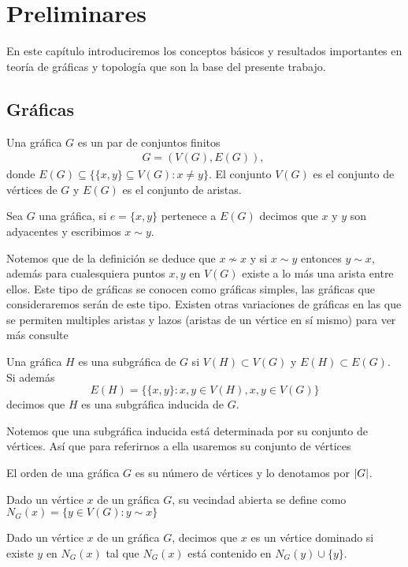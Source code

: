\chapter{Preliminares}                %
En este capítulo introduciremos los conceptos básicos y resultados importantes en teoría de gráficas y topología que son la base del presente trabajo.
\section{Gráficas}
\begin{Defi}[Gráfica]
Una gráfica $G$ es un par de conjuntos finitos 
\begin{eqnarray*}
G=(V(G),E(G)),\
\end{eqnarray*}
donde $E(G)\subseteq \{\{x,y\}\subseteq V(G):x \neq y\}$. El conjunto $V(G)$ es el conjunto de vértices de $G$ y $E(G)$ es el conjunto de aristas.
\end{Defi}
\begin{Defi}
Sea $G$ una gráfica, si $e =\{x,y\}$ pertenece a $E(G)$ decimos que $x$ y $y$ son adyacentes y escribimos $x \sim y$.
\end{Defi}
 Notemos que de la definición se deduce que $x\nsim x$ y si $x\sim y$ entonces $y\sim x$, además para cualesquiera puntos $x,y$ en $V(G)$ existe a lo más una arista entre ellos. Este tipo de gráficas se conocen como gráficas simples, las gráficas que consideraremos serán de este tipo.  
Existen otras variaciones de gráficas en las que se permiten multiples aristas y lazos (aristas de un vértice en sí mismo) para ver más consulte \cite{Harary1969} 

\begin{Defi}[Subgráfica]
Una gráfica $H$ es una subgráfica de $G$ si $V(H)\subset V(G)$ y $E(H)\subset E(G)$. Si además 
\begin{equation*}
E(H) = \{\{x,y\}\colon x,y \in V(H), {x,y}\in V(G)\}
\end{equation*}
decimos que $H$ es una subgráfica inducida de $G$.
\end{Defi}
Notemos que una subgráfica inducida está determinada por su conjunto de vértices. Así que para referirnos a ella usaremos su conjunto de vértices

\begin{Defi}
El orden de una gráfica $G$ es su número de vértices y lo denotamos por $\left| G \right|$.
\end{Defi}
\begin{Defi}
Dado un vértice $x$ de un  gráfica $G$, su vecindad abierta se define como $N_{G}(x) = \{y\in V(G): y\sim x\}$ 
\end{Defi}
\begin{Defi}
Dado un vértice $x$ de un  gráfica $G$, decimos que $x$ es un vértice dominado si existe $y$ en $N_{G}(x)$ tal que $N_{G}(x)$ está contenido en $N_{G}(y)\cup\{y\}$.
\end{Defi}

